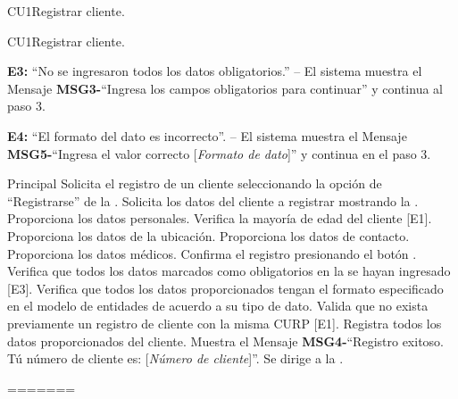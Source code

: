 \begin{UseCase}{CU1}{Registrar cliente.}
\begin{UseCase}{CU1}{Registrar cliente.}
{				{\bf E3:} ``No se ingresaron todos los datos obligatorios.'' -- El sistema muestra el Mensaje {\bf MSG3-}``Ingresa los campos obligatorios para continuar'' y continua al paso 3.
				
				{\bf E4:} ``El formato del dato es incorrecto''. -- El sistema muestra el Mensaje {\bf MSG5-}``Ingresa el valor correcto [{\em Formato de dato}]'' y continua en el paso 3.}
	\end{UseCase}

	\begin{UCtrayectoria}{Principal}
		\UCpaso[\UCactor] Solicita el registro de un cliente seleccionando la opción de ``Registrarse'' de la .
		\UCpaso Solicita los datos del cliente a registrar mostrando la .
		\UCpaso[\UCactor] Proporciona los datos personales.
		\UCpaso Verifica la mayoría de edad del cliente [E1].
		\UCpaso[\UCactor] Proporciona los datos de la ubicación.
		\UCpaso[\UCactor] Proporciona los datos de contacto.
		\UCpaso[\UCactor] Proporciona los datos médicos.
		\UCpaso[\UCactor] Confirma el registro presionando el botón .
		\UCpaso Verifica que todos los datos marcados como obligatorios en la  se hayan ingresado [E3].
		\UCpaso Verifica que todos los datos proporcionados tengan el formato especificado en el modelo de entidades de acuerdo a su tipo de dato.
		\UCpaso Valida que no exista previamente un registro de cliente con la misma CURP [E1].
		\UCpaso Registra todos los datos proporcionados del cliente.
		\UCpaso Muestra el Mensaje {\bf MSG4-}``Registro exitoso. Tú número de cliente es: [{\em Número de cliente}]''.
		\UCpaso Se dirige a la .
		
	\end{UCtrayectoria}
	

		

	
=======
\end{UseCase}
